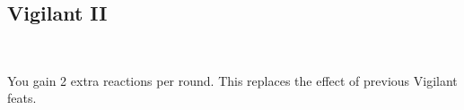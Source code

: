 \subsection*{Vigilant II}\label{feat:vigilant2}
 \\

You gain 2 extra reactions per round. This replaces the effect
of previous Vigilant feats.
